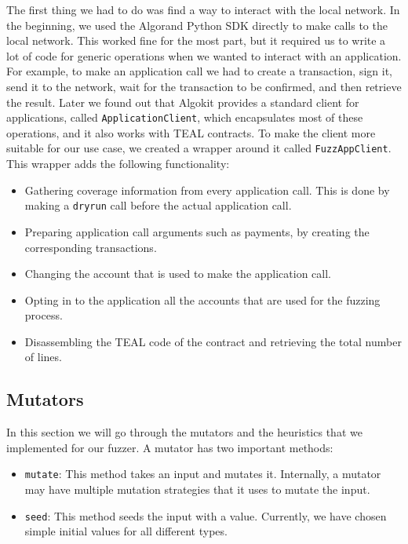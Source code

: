The first thing we had to do was find a way to interact with the local network.
In the beginning, we used the Algorand Python \acs{SDK} directly to make calls to the local network.
This worked fine for the most part, but it required us to write a lot of code for generic operations when we wanted to interact with an application.
For example, to make an application call we had to create a transaction, sign it, send it to the network, wait for the transaction to be confirmed, and then retrieve the result.
Later we found out that Algokit provides a standard client for applications, called \texttt{ApplicationClient}, which encapsulates most of these operations, and it also works with \ac{TEAL} contracts.
To make the client more suitable for our use case, we created a wrapper around it called \texttt{FuzzAppClient}.
This wrapper adds the following functionality:
\begin{itemize}
    \item Gathering coverage information from every application call. This is done by making a \texttt{dryrun} call before the actual application call.
    \item Preparing application call arguments such as payments, by creating the corresponding transactions.
    \item Changing the account that is used to make the application call.
    \item Opting in to the application all the accounts that are used for the fuzzing process.
    \item Disassembling the \ac{TEAL} code of the contract and retrieving the total number of lines.
\end{itemize}


\subsection*{Mutators} \label{section:mutators}
In this section we will go through the mutators and the heuristics that we implemented for our fuzzer.
A mutator has two important methods:
\begin{itemize}
    \item \texttt{mutate}: This method takes an input and mutates it.
          Internally, a mutator may have multiple mutation strategies that it uses to mutate the input.
    \item \texttt{seed}: This method seeds the input with a value.
          Currently, we have chosen simple initial values for all different types.
\end{itemize}


